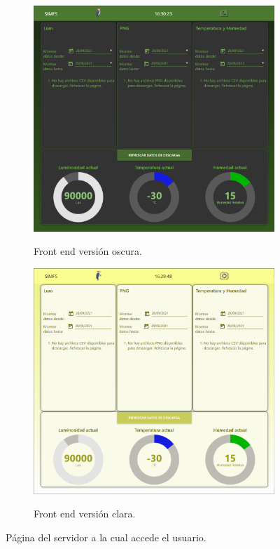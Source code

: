 
\begin{figure}[H]
\centering
	\begin{subfigure}[b]{0.49\textwidth}
		\centering
		\includegraphics[width=\linewidth]{ImagenesIngenieria de Detalle/Node-Red-Dark}
	\label{fig:front_end_dark}
	\caption{Front end versión oscura.}
	\end{subfigure}
	\begin{subfigure}[b]{0.49\textwidth}
		\centering
		\includegraphics[width=\linewidth]{ImagenesIngenieria de Detalle/Node-Red-Light}
	\label{fig:front_end_light}
	\caption{Front end versión clara.}
	\end{subfigure}	
	\caption{Página del servidor a la cual accede el usuario.}
\end{figure}